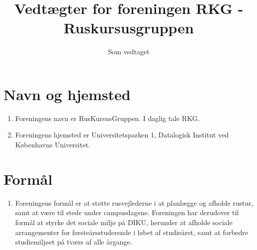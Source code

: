 \documentclass[a4paper, 10pt]{article}
\title{Vedtægter for foreningen RKG - Ruskursusgruppen}
\author{}
\date{Som vedtaget \vedtagsdato{}}
\renewcommand\thesection{\textsection\arabic{section}}
\newenvironment{stykenum}{
  \begin{enumerate}[%
    label=Stk.~\arabic*:, ref=\thesection~Stk.~\arabic{enumi}, start=1]
}{\end{enumerate}}
\begin{document}
\maketitle
\thispagestyle{first}

\section{Navn og hjemsted}
\begin{stykenum}
    \item \label{navn} Foreningens navn er RusKursusGruppen. I daglig tale RKG.

    \item \label{hjemsted} Foreningens hjemsted er Universitetsparken 1,
        Datalogisk Institut ved Københavns Universitet.

\end{stykenum}

\section{Formål}
\begin{stykenum}
\item \label{formaal} Foreningens formål er at støtte rusvejlederne i at planlægge og afholde rustur, samt at være til stede under campusdagene. Foreningen har derudover til formål at styrke det sociale miljø på DIKU, herunder at afholde sociale arrangementer for førsteårsstuderende i løbet af studieåret, samt at forbedre studiemiljøet på tværs af alle årgange.
\end{stykenum}
\end{document}
